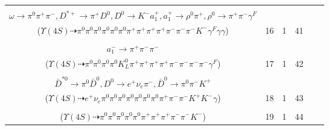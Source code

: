 \documentclass[landscape]{article}
\newcounter{rownumbers}
\newcommand\rn{\stepcounter{rownumbers}\arabic{rownumbers}}
\newcommand{\EOLP}{\\ \hline} %
\newcommand{\topoTags}[1]{#1} %
\begin{document}
\begin{longtable}{clcccc}
\rn & \makecell[l]{ $ 
\Upsilon(4S) \rightarrow B^{0} \bar{B}^{0} ,
B^{0} \rightarrow \pi^{0} \bar{D}^{0} ,
\bar{B}^{0} \rightarrow \pi^{0} \rho^{-} \eta \omega D^{*+} ,
\bar{D}^{0} \rightarrow \pi^{0} \pi^{0} ,
\rho^{-} \rightarrow \pi^{0} \pi^{-} ,
\eta \rightarrow \gamma \gamma ,
$ \\ $
\omega \rightarrow \pi^{0} \pi^{+} \pi^{-} ,
D^{*+} \rightarrow \pi^{+} D^{0} ,
D^{0} \rightarrow K^{-} a_{1}^{+} ,
a_{1}^{+} \rightarrow \rho^{0} \pi^{+} ,
\rho^{0} \rightarrow \pi^{+} \pi^{-} \gamma^{F} 
$ \\ ($
\Upsilon(4S) \dashrightarrow \pi^{0} \pi^{0} \pi^{0} \pi^{0} \pi^{0} \pi^{0} \pi^{+} \pi^{+} \pi^{+} \pi^{+} \pi^{-} \pi^{-} \pi^{-} K^{-} \gamma^{F} \gamma \gamma 
$) } & \topoTags{16 & }1 & 41 \EOLP

\rn & \makecell[l]{ $ 
\Upsilon(4S) \rightarrow B^{0} \bar{B}^{0} ,
B^{0} \rightarrow \pi^{+} \pi^{+} \pi^{-} \pi^{-} \rho^{+} D^{-} \gamma^{F} ,
\bar{B}^{0} \rightarrow \pi^{0} D^{0} ,
\rho^{+} \rightarrow \pi^{0} \pi^{+} ,
D^{-} \rightarrow K_{L}^{0} a_{1}^{-} ,
D^{0} \rightarrow \pi^{0} \pi^{0} ,
$ \\ $
a_{1}^{-} \rightarrow \pi^{+} \pi^{-} \pi^{-} 
$ \\ ($
\Upsilon(4S) \dashrightarrow \pi^{0} \pi^{0} \pi^{0} \pi^{0} K_{L}^{0} \pi^{+} \pi^{+} \pi^{+} \pi^{+} \pi^{-} \pi^{-} \pi^{-} \pi^{-} \gamma^{F} 
$) } & \topoTags{17 & }1 & 42 \EOLP

\rn & \makecell[l]{ $ 
\Upsilon(4S) \rightarrow B^{0} \bar{B}^{0} ,
B^{0} \rightarrow \pi^{0} \bar{D}^{0} ,
\bar{B}^{0} \rightarrow \pi^{0} \pi^{+} K^{*-} D^{*0} \bar{D}^{*0} ,
\bar{D}^{0} \rightarrow \pi^{0} \pi^{0} ,
K^{*-} \rightarrow \pi^{0} K^{-} ,
D^{*0} \rightarrow D^{0} \gamma ,
$ \\ $
\bar{D}^{*0} \rightarrow \pi^{0} \bar{D}^{0} ,
D^{0} \rightarrow e^{+} \nu_{e} \pi^{-} ,
\bar{D}^{0} \rightarrow \pi^{0} \pi^{-} K^{+} 
$ \\ ($
\Upsilon(4S) \dashrightarrow e^{+} \nu_{e} \pi^{0} \pi^{0} \pi^{0} \pi^{0} \pi^{0} \pi^{0} \pi^{0} \pi^{+} \pi^{-} \pi^{-} K^{+} K^{-} \gamma 
$) } & \topoTags{18 & }1 & 43 \EOLP

\rn & \makecell[l]{ $ 
\Upsilon(4S) \rightarrow \bar{B}^{0} \bar{B}^{0} ,
\bar{B}^{0} \rightarrow \pi^{0} D^{0} ,
\bar{B}^{0} \rightarrow \pi^{0} \pi^{+} \pi^{-} \pi^{-} D^{*+} ,
D^{0} \rightarrow \pi^{0} \pi^{0} ,
D^{*+} \rightarrow \pi^{+} D^{0} ,
D^{0} \rightarrow \pi^{0} \pi^{+} K^{-} 
$ \\ ($
\Upsilon(4S) \dashrightarrow \pi^{0} \pi^{0} \pi^{0} \pi^{0} \pi^{0} \pi^{+} \pi^{+} \pi^{+} \pi^{-} \pi^{-} K^{-} 
$) } & \topoTags{19 & }1 & 44 \EOLP


\end{longtable}
\end{document}
